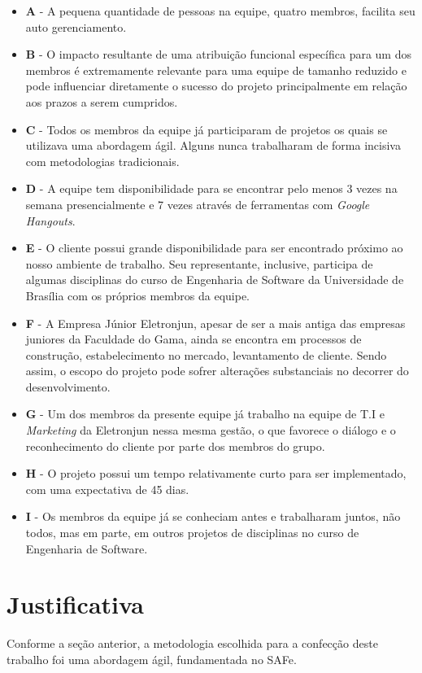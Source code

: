 \begin{itemize}
\item \textbf{A} - A pequena quantidade de pessoas na equipe, quatro membros, facilita seu auto gerenciamento.
\item \textbf{B} - O impacto resultante de uma atribuição funcional específica para um dos membros é extremamente relevante para uma equipe de tamanho reduzido e pode influenciar diretamente o sucesso do projeto principalmente em relação aos prazos a serem cumpridos.
\item \textbf{C} - Todos os membros da equipe já participaram de projetos os quais se utilizava uma abordagem ágil. Alguns nunca trabalharam de forma incisiva com metodologias tradicionais.
\item \textbf{D} - A equipe tem disponibilidade para se encontrar pelo menos 3 vezes na semana presencialmente e 7 vezes através de ferramentas com \textit{Google Hangouts}.
\item \textbf{E} - O cliente possui grande disponibilidade para ser encontrado próximo ao nosso ambiente de trabalho. Seu representante, inclusive, participa de algumas disciplinas do curso de Engenharia de Software da Universidade de Brasília com os próprios membros da equipe.
\item \textbf{F} - A Empresa Júnior Eletronjun, apesar de ser a mais antiga das empresas juniores da Faculdade do Gama, ainda se encontra em processos de construção, estabelecimento no mercado, levantamento de cliente. Sendo assim, o escopo do projeto pode sofrer alterações substanciais no decorrer do desenvolvimento.
\item \textbf{G} - Um dos membros da presente equipe já trabalho na equipe de T.I e \textit{Marketing} da Eletronjun nessa mesma gestão, o que favorece o diálogo e o reconhecimento do cliente por parte dos membros do grupo.
\item \textbf{H} - O projeto possui um tempo relativamente curto para ser implementado, com uma expectativa de 45 dias.
\item \textbf{I} - Os membros da equipe já se conheciam antes e trabalharam juntos, não todos, mas em parte, em outros projetos de disciplinas no curso de Engenharia de Software.
\end{itemize}			

  \section{Justificativa}
Conforme a seção anterior, a metodologia escolhida para a confecção deste trabalho foi uma abordagem ágil, fundamentada no SAFe.

